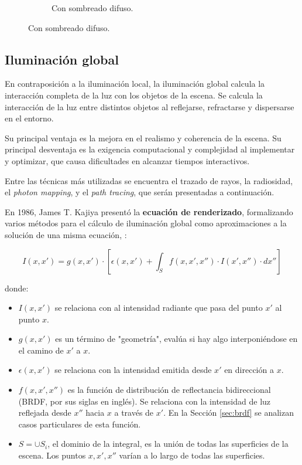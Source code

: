 \begin{figure}
\begin{center}
\begin{subfigure}{.49\textwidth}
        \caption{Con sombreado difuso.}
    \end{subfigure}
    \label{fig:sphere-blinn-phong}
    \end{center}
\end{figure}

\subsection{Iluminación global}

En contraposición a la iluminación local, la iluminación global calcula la interacción completa de la luz con los objetos de la escena.
Se calcula la interacción de la luz entre distintos objetos al reflejarse, refractarse y dispersarse en el entorno.

Su principal ventaja es la mejora en el realismo y coherencia de la escena.
Su principal desventaja es la exigencia computacional y complejidad al implementar y optimizar, que causa dificultades en alcanzar tiempos interactivos.

Entre las técnicas más utilizadas se encuentra el trazado de rayos, la radiosidad, el \textit{photon mapping}, y el \textit{path tracing}, que serán presentadas a continuación.

En 1986, James T. Kajiya presentó la \textbf{ecuación de renderizado}, formalizando varios métodos para el cálculo de iluminación global como aproximaciones a la solución de una misma ecuación, \cite{rendering-equation}:

\begin{equation}\label{eq:rendering-equation}
    I(x, x') = g(x, x') \cdot \left[\epsilon(x, x') + \int_S f(x, x', x'') \cdot I(x', x'') \cdot dx'' \right]
\end{equation}

donde:
\begin{itemize}
    \item $I(x, x')$ se relaciona con al intensidad radiante que pasa del punto $x'$ al punto $x$.
    \item $g(x, x')$ es un término de "geometría", evalúa si hay algo interponiéndose en el camino de $x'$ a $x$.
    \item $\epsilon(x, x')$ se relaciona con la intensidad emitida desde $x'$ en dirección a $x$.
    \item $f(x, x', x'')$ es la función de distribución de reflectancia bidireccional (BRDF, por sus siglas en inglés). Se relaciona con la intensidad de luz reflejada desde $x''$ hacia $x$ a través de $x'$. En la Sección \ref{sec:brdf} se analizan casos particulares de esta función.
    \item $S = \cup{S_i}$, el dominio de la integral, es la unión de todas las superficies de la escena. Los puntos $x, x', x''$ varían a lo largo de todas las superficies.
\end{itemize}


